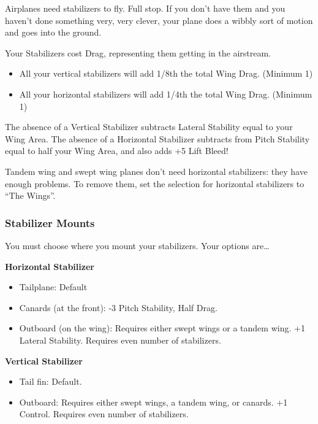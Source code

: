 \documentclass{article}
\begin{document}
Airplanes need stabilizers to fly. Full stop. If you don't have them and
you haven't done something very, very clever, your plane does a wibbly
sort of motion and goes into the ground.

Your Stabilizers cost Drag, representing them getting in the airstream.

\begin{itemize}
    \item          All your vertical stabilizers will add 1/8th the total Wing
          Drag. (Minimum 1)
    \item          All your horizontal stabilizers will add 1/4th the total Wing
          Drag. (Minimum 1)
\end{itemize}

The absence of a Vertical Stabilizer subtracts Lateral Stability equal
to your Wing Area. The absence of a Horizontal Stabilizer subtracts from
Pitch Stability equal to half your Wing Area, and also adds +5 Lift
Bleed!

Tandem wing and swept wing planes don't need horizontal stabilizers:
they have enough problems. To remove them, set the selection for
horizontal stabilizers to ``The Wings''.

\subsubsection{Stabilizer Mounts}
\label{_Stabilizer Mounts}

You must choose where you mount your stabilizers. Your options
are\ldots{}

\textbf{Horizontal Stabilizer}

\begin{itemize}
    \item          Tailplane: Default
    \item          Canards (at the front): -3 Pitch Stability, Half Drag.
    \item          Outboard (on the wing): Requires either swept wings or a tandem
          wing. +1 Lateral Stability. Requires even number of stabilizers.
\end{itemize}

\textbf{Vertical Stabilizer}

\begin{itemize}
    \item          Tail fin: Default.
    \item          Outboard: Requires either swept wings, a tandem wing, or
          canards. +1 Control. Requires even number of stabilizers.
\end{itemize}
\end{document}
